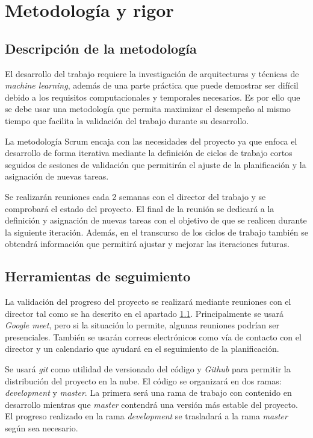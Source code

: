 \chapter{Metodología y rigor}
\section{Descripción de la metodología}\label{methodology}
El desarrollo del trabajo requiere la investigación de arquitecturas y técnicas de \textit{machine learning},
además de una parte práctica que puede demostrar ser difícil debido a los requisitos computacionales
y temporales necesarios.
Es por ello que se debe usar una metodología que permita maximizar el desempeño al mismo tiempo
que facilita la validación del trabajo durante su desarrollo.

La metodología Scrum encaja con las necesidades del proyecto ya que enfoca el desarrollo de
forma iterativa mediante la definición de ciclos de trabajo cortos seguidos de sesiones
de validación que permitirán el ajuste de la planificación y la asignación de nuevas tareas.

Se realizarán reuniones cada 2 semanas con el director del trabajo y se comprobará
el estado del proyecto. El final de la reunión se dedicará a la definición y asignación de
nuevas tareas con el objetivo de que se realicen durante la siguiente iteración.
Además, en el transcurso de los ciclos de trabajo también se obtendrá información
que permitirá ajustar y mejorar las iteraciones futuras.


\section{Herramientas de seguimiento}\label{methodtools}
La validación del progreso del proyecto se realizará mediante reuniones con el director
tal como se ha descrito en el apartado \ref{methodology}. Principalmente se usará
\textit{Google meet}, pero si la situación lo permite, algunas reuniones podrían ser presenciales.
También se usarán correos electrónicos como vía de contacto con el director y un calendario
que ayudará en el seguimiento de la planificación.  

Se usará \textit{git} como utilidad de versionado del código y \textit{Github} para permitir
la distribución del proyecto en la nube. El código se organizará en dos ramas: \textit{development} y \textit{master}. La primera
será una rama de trabajo con contenido en desarrollo mientras que \textit{master} contendrá
una versión más estable del proyecto. El progreso realizado en la rama \textit{development} se
trasladará a la rama \textit{master} según sea necesario.

